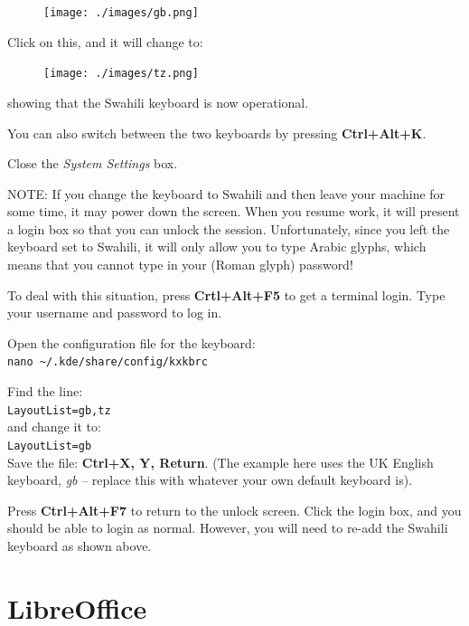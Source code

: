 \documentclass[a4paper,10pt, oneside]{book}
\begin{document}
\begin{figure}[h]
\centering
\texttt{[image: ./images/gb.png]}
\end{figure}

Click on this, and it will change to:

\begin{figure}[h]
\centering
\texttt{[image: ./images/tz.png]}
\end{figure}

showing that the Swahili keyboard is now operational. 

You can also switch between the two keyboards by pressing \textbf{Ctrl+Alt+K}.

Close the \textit{System Settings} box.

NOTE: If you change the keyboard to Swahili and then leave your machine for some time, it may power down the screen.  When you resume work, it will present a login box so that you can unlock the session.  Unfortunately, since you left the keyboard set to Swahili, it will only allow you to type Arabic glyphs, which means that you cannot type in your (Roman glyph) password!

To deal with this situation, press \textbf{Crtl+Alt+F5} to get a terminal login.  Type your username and password to log in.

Open the configuration file for the keyboard:\\
\verb|nano ~/.kde/share/config/kxkbrc|

Find the line:\\
\verb|LayoutList=gb,tz|\\
and change it to:\\
\verb|LayoutList=gb|\\
Save the file: \textbf{Ctrl+X, Y, Return}.  (The example here uses the UK English keyboard, \textit{gb} -- replace this with whatever your own default keyboard is).

Press \textbf{Ctrl+Alt+F7} to return to the unlock screen.  Click the login box, and you should be able to login as normal.  However, you will need to re-add the Swahili keyboard as shown above.



\section{LibreOffice}
\label{s:libreoffice}
\end{document}
